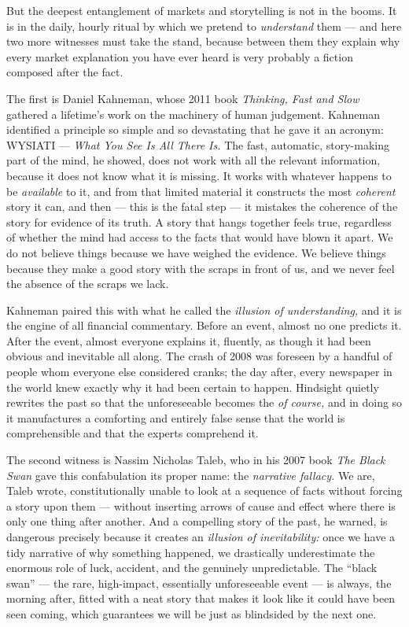 But the deepest entanglement of markets and storytelling is not in the booms. It is in the daily, hourly ritual by which we pretend to \emph{understand} them — and here two more witnesses must take the stand, because between them they explain why every market explanation you have ever heard is very probably a fiction composed after the fact.

The first is Daniel Kahneman, whose 2011 book \emph{Thinking, Fast and Slow} gathered a lifetime's work on the machinery of human judgement. Kahneman identified a principle so simple and so devastating that he gave it an acronym: WYSIATI — \emph{What You See Is All There Is.} The fast, automatic, story-making part of the mind, he showed, does not work with all the relevant information, because it does not know what it is missing. It works with whatever happens to be \emph{available} to it, and from that limited material it constructs the most \emph{coherent} story it can, and then — this is the fatal step — it mistakes the coherence of the story for evidence of its truth. A story that hangs together feels true, regardless of whether the mind had access to the facts that would have blown it apart. We do not believe things because we have weighed the evidence. We believe things because they make a good story with the scraps in front of us, and we never feel the absence of the scraps we lack.

Kahneman paired this with what he called the \emph{illusion of understanding,} and it is the engine of all financial commentary. Before an event, almost no one predicts it. After the event, almost everyone explains it, fluently, as though it had been obvious and inevitable all along. The crash of 2008 was foreseen by a handful of people whom everyone else considered cranks; the day after, every newspaper in the world knew exactly why it had been certain to happen. Hindsight quietly rewrites the past so that the unforeseeable becomes the \emph{of course,} and in doing so it manufactures a comforting and entirely false sense that the world is comprehensible and that the experts comprehend it.

The second witness is Nassim Nicholas Taleb, who in his 2007 book \emph{The Black Swan} gave this confabulation its proper name: the \emph{narrative fallacy.} We are, Taleb wrote, constitutionally unable to look at a sequence of facts without forcing a story upon them — without inserting arrows of cause and effect where there is only one thing after another. And a compelling story of the past, he warned, is dangerous precisely because it creates an \emph{illusion of inevitability:} once we have a tidy narrative of why something happened, we drastically underestimate the enormous role of luck, accident, and the genuinely unpredictable. The ``black swan'' — the rare, high-impact, essentially unforeseeable event — is always, the morning after, fitted with a neat story that makes it look like it could have been seen coming, which guarantees we will be just as blindsided by the next one.

